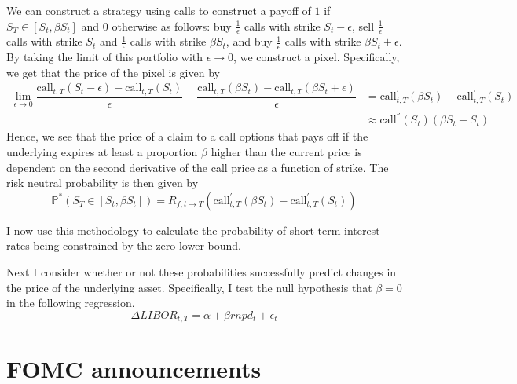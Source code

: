 \documentclass[11pt]{article}
\begin{document}
We can construct a strategy using calls to construct a payoff of $1$ if $S_{T} \in \left[S_{t}, \beta S_{t}\right]$ and $0$ otherwise as follows: buy $\frac{1}{\epsilon}$ calls with strike $S_{t} - \epsilon$, sell $\frac{1}{\epsilon}$ calls with strike $S_{t}$ and $\frac{1}{\epsilon}$ calls with strike $\beta S_{t}$, and buy $\frac{1}{\epsilon}$ calls with strike $\beta S_{t} + \epsilon$. By taking the limit of this portfolio with $\epsilon \to 0$, we construct a pixel. Specifically, we get that the price of the pixel is given by 
\begin{equation*}
\begin{split}
\lim\limits_{\epsilon \to 0} \dfrac{\text{call}_{t, T}(S_{t} - \epsilon) - \text{call}_{t, T}(S_{t})}{\epsilon} - \dfrac{\text{call}_{t, T}(\beta S_{t}) - \text{call}_{t, T}(\beta S_{t} + \epsilon)}{\epsilon} &= \text{call}^{'}_{t, T}(\beta S_{t}) - \text{call}^{'}_{t, T}(S_{t}) \\
&\approx \text{call}^{''}(S_{t})(\beta S_{t} - S_{t})
\end{split}
\end{equation*}
Hence, we see that the price of a claim to a call options that pays off if the underlying expires at least a proportion $\beta$ higher than the current price is dependent on the second derivative of the call price as a function of strike. The risk neutral probability is then given by 
\begin{equation*}
	\mathbb{P}^{*}(S_{T}\in\left[S_{t}, \beta S_{t}\right]) = R_{f, t\to T}( \text{call}^{'}_{t, T}(\beta S_{t}) - \text{call}^{'}_{t, T}(S_{t}) )
\end{equation*}


I now use this methodology to calculate the probability of short term interest rates being constrained by the zero lower bound. 





{\color{red} Next I consider whether or not these probabilities successfully predict changes in the price of the underlying asset. Specifically, I test the null hypothesis that $\beta = 0$ in the following regression. 
	\begin{equation*}
	\Delta LIBOR_{t, T} = \alpha + \beta rnpd_{t} + \epsilon_{t}
	\end{equation*}}


\section{FOMC announcements}
\end{document}

